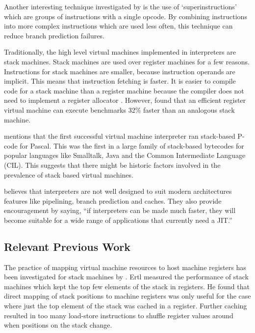 		Another interesting technique investigated by \citeauthor{optimizingindirectbranch} is the use of `superinstructions' which are groups of instructions with a single opcode. By combining instructions into more complex instructions which are used less often, this technique can reduce branch prediction failures.
		
		Traditionally, the high level virtual machines implemented in interpreters are stack machines. Stack machines are used over register machines for a few reasons. Instructions for stack machines are smaller, because instruction operands are implicit. This means that instruction fetching is faster. It is easier to compile code for a stack machine than a register machine because the compiler does not need to implement a register allocator \citep{caseregistervm}. However, \cite{stackregistershowdown} found that an efficient register virtual machine can execute benchmarks 32\% faster than an analogous stack machine. 
		
		\cite{caseregistervm} mentions that the first successful virtual machine interpreter ran stack-based P-code for Pascal. This was the first in a large family of stack-based bytecodes for popular languages like Smalltalk, Java and the Common Intermediate Language (CIL). This suggests that there might be historic factors involved in the prevalence of stack based virtual machines.
		
		\cite{fastjava} believes that interpreters are not well designed to suit modern architectures features like pipelining, branch prediction and caches. They also provide encouragement by saying, ``if interpreters can be made much faster, they will become suitable for a wide range of applications that currently need a JIT.''
		
		\subsection{Relevant Previous Work}
		The practice of mapping virtual machine resources to host machine registers has been investigated for stack machines by \cite{stackcaching}. Ertl measured the performance of stack machines which kept the top few elements of the stack in registers. He found that direct mapping of stack positions to machine registers was only useful for the case where just the top element of the stack was cached in a register. Further caching resulted in too many load-store instructions to shuffle register values around when positions on the stack change.
		
